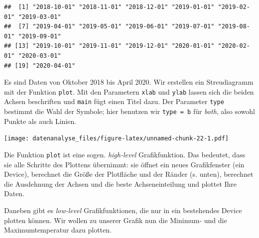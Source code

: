 \documentclass[]{book}
\newenvironment{Shaded}{\begin{snugshade}}{\end{snugshade}}
\newcommand{\DataTypeTok}[1]{\textcolor[rgb]{0.13,0.29,0.53}{#1}}
\newcommand{\KeywordTok}[1]{\textcolor[rgb]{0.13,0.29,0.53}{\textbf{#1}}}
\newcommand{\NormalTok}[1]{#1}
\newcommand{\OperatorTok}[1]{\textcolor[rgb]{0.81,0.36,0.00}{\textbf{#1}}}
\newcommand{\StringTok}[1]{\textcolor[rgb]{0.31,0.60,0.02}{#1}}
\begin{document}
\begin{Shaded}
\end{Shaded}

\begin{verbatim}
##  [1] "2018-10-01" "2018-11-01" "2018-12-01" "2019-01-01" "2019-02-01" "2019-03-01"
##  [7] "2019-04-01" "2019-05-01" "2019-06-01" "2019-07-01" "2019-08-01" "2019-09-01"
## [13] "2019-10-01" "2019-11-01" "2019-12-01" "2020-01-01" "2020-02-01" "2020-03-01"
## [19] "2020-04-01"
\end{verbatim}

Es sind Daten von Oktober 2018 bis April 2020. Wir erstellen ein Streudiagramm mit der Funktion \texttt{plot}. Mit den Parametern \texttt{xlab} und \texttt{ylab} lassen sich die beiden Achsen beschriften und \texttt{main} fügt einen Titel dazu. Der Parameter \texttt{type} bestimmt die Wahl der Symbole; hier benutzen wir \texttt{type\ =\ b} für \emph{both}, also sowohl Punkte als auch Linien.

\begin{Shaded}
\end{Shaded}

\texttt{[image: datenanalyse\_files/figure-latex/unnamed-chunk-22-1.pdf]}

Die Funktion \texttt{plot} ist eine sogen. \emph{high-level} Grafikfunktion. Das bedeutet, dass sie alle Schritte des Plottens übernimmt: sie öffnet ein neues Grafikfenster (ein Device), berechnet die Größe der Plotfläche und der Ränder (s. unten), berechnet die Ausdehnung der Achsen und die beste Achseneinteilung und plottet Ihre Daten.

Daneben gibt es \emph{low-level} Grafikfunktionen, die nur in ein bestehendes Device plotten können. Wir wollen zu unserer Grafik nun die Minimum- und die Maximumtemperatur dazu plotten.
\end{document}
